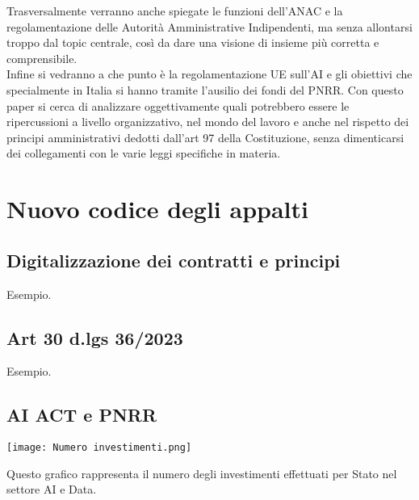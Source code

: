 \documentclass{article}
\begin{document}
\begin{justify}
Trasversalmente verranno anche spiegate le funzioni dell'ANAC e la regolamentazione delle Autorità Amministrative Indipendenti, ma senza allontarsi troppo dal topic centrale, così da dare una visione di insieme più corretta e comprensibile.\\
Infine si vedranno a che punto è la regolamentazione UE sull'AI e gli obiettivi che specialmente in Italia si hanno tramite l'ausilio dei fondi del PNRR.
Con questo paper si cerca di analizzare oggettivamente quali potrebbero essere le ripercussioni a livello organizzativo, nel mondo del lavoro e anche nel rispetto dei principi amministrativi dedotti dall'art 97 della Costituzione, senza dimenticarsi dei collegamenti con le varie leggi specifiche in materia.
\end{justify}

\centering
\section{Nuovo codice degli appalti}
\begin{justify}
    
\end{justify}

\newpage\subsection{Digitalizzazione dei contratti e principi}
\begin{justify}
    Esempio.
\end{justify}

\subsection{Art 30 d.lgs 36/2023}
\begin{justify}
    Esempio.
\end{justify}


\subsection{AI ACT e PNRR}
\begin{center}
    \texttt{[image: Numero investimenti.png]}
\end{center}
\begin{justify}
    Questo grafico rappresenta il numero degli investimenti effettuati per Stato nel settore AI e Data.
\end{justify}
\end{document}
